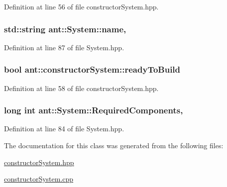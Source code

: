 Definition at line 56 of file constructor\+System.\+hpp.

\hypertarget{classant_1_1_system_a60b3c00a760a3b4947ab1f1fc534a5b2}{
\subsubsection[{name}]{\setlength{\rightskip}{0pt plus 5cm}std\+::string ant\+::\+System\+::name\hspace{0.3cm}{\ttfamily [protected]}, {\ttfamily [inherited]}}}\label{classant_1_1_system_a60b3c00a760a3b4947ab1f1fc534a5b2}


Definition at line 87 of file System.\+hpp.

\hypertarget{classant_1_1constructor_system_a343406debd8f091bd1dccec63a86b8e9}{
\subsubsection[{ready\+To\+Build}]{\setlength{\rightskip}{0pt plus 5cm}bool ant\+::constructor\+System\+::ready\+To\+Build\hspace{0.3cm}{\ttfamily [private]}}}\label{classant_1_1constructor_system_a343406debd8f091bd1dccec63a86b8e9}


Definition at line 58 of file constructor\+System.\+hpp.

\hypertarget{classant_1_1_system_a4ef41cfc496e41ac6730f90629524ec7}{
\subsubsection[{Required\+Components}]{\setlength{\rightskip}{0pt plus 5cm}long int ant\+::\+System\+::\+Required\+Components\hspace{0.3cm}{\ttfamily [protected]}, {\ttfamily [inherited]}}}\label{classant_1_1_system_a4ef41cfc496e41ac6730f90629524ec7}


Definition at line 84 of file System.\+hpp.



The documentation for this class was generated from the following files\+:\begin{DoxyCompactItemize}
\item 
\hyperlink{constructor_system_8hpp}{constructor\+System.\+hpp}\item 
\hyperlink{constructor_system_8cpp}{constructor\+System.\+cpp}\end{DoxyCompactItemize}
